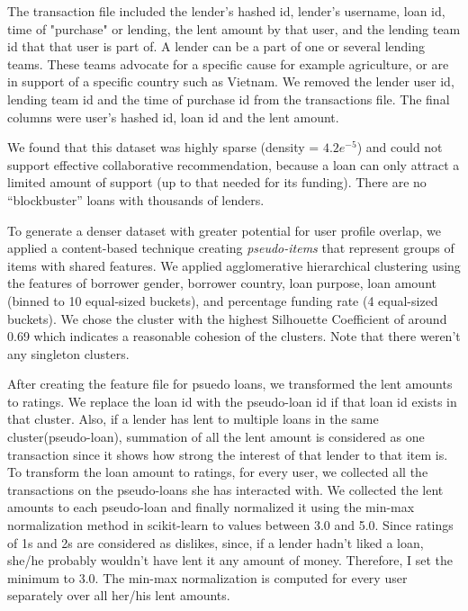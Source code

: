     The transaction file included the lender's hashed id, lender's username, loan id, time of "purchase" or lending, the lent amount by that user, and the lending team id that that user is part of. A lender can be a part of one or several lending teams. These teams advocate for a specific cause for example agriculture, or are in support of a specific country such as Vietnam. We removed the lender user id, lending team id and the time of purchase id from the transactions file. The final columns were user's hashed id, loan id and the lent amount.
    
    
    We found that this dataset was highly sparse (density = $4.2e^{-5}$) and could not support effective collaborative recommendation, because a loan can only attract a limited amount of support (up to that needed for its funding). There are no ``blockbuster'' loans with thousands of lenders.
    
    To generate a denser dataset with greater potential for user profile overlap, we applied a content-based technique creating \textit{pseudo-items} that represent groups of items with shared features. We applied agglomerative hierarchical clustering \cite{rokach2005clustering} using the features of borrower gender, borrower country, loan purpose, loan amount (binned to 10 equal-sized buckets), and percentage funding rate (4 equal-sized buckets). We chose the cluster with the highest Silhouette Coefficient \cite{rousseeuw1987silhouettes} of around 0.69 which indicates a reasonable cohesion of the clusters. Note that there weren't any singleton clusters.
    
    After creating the feature file for psuedo loans, we transformed the lent amounts to ratings. We replace the loan id with the pseudo-loan id if that loan id exists in that cluster. Also, if a lender has lent to multiple loans in the same cluster(pseudo-loan), summation of all the lent amount is considered as one transaction since it shows how strong the interest of that lender to that item is.
    To transform the loan amount to ratings, for every user, we collected all the transactions on the pseudo-loans she has interacted with. We collected the lent amounts to each pseudo-loan and finally normalized it using the min-max normalization method in scikit-learn \cite{scikit-learn} to values between 3.0 and 5.0. Since ratings of 1s and 2s are considered as dislikes, since, if a lender hadn't liked a loan, she/he probably wouldn't have lent it any amount of money. Therefore, I set the minimum to 3.0. The min-max normalization is computed for every user separately over all her/his lent amounts.

